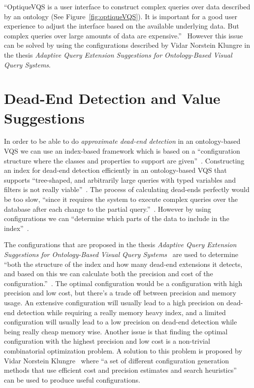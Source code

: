 \documentclass[a4paper,english]{ifimaster/ifimaster}
\begin{document}
``OptiqueVQS is a user interface to construct complex queries over data described by an ontology (See Figure~\ref{fig:optiqueVQS}). It is important for a good user experience to adjust the interface based on the available underlying data. But complex queries over large amounts of data are expensive.''~\cite{VQS_search} However this issue can be solved by using the configurations described by Vidar Norstein Klungre in the thesis \textit{Adaptive Query Extension Suggestions for Ontology-Based Visual Query Systems}.~\cite{vidar-phd-2020}


\section{Dead-End Detection and Value Suggestions}

In order to be able to do \textit{approximate dead-end detection} in an ontology-based VQS we can use an index-based framework which is based on a ``configuration structure where the classes and properties to support are given''~\cite{vidar-phd-2020}. Constructing an index for dead-end detection efficiently in an ontology-based VQS that supports ``tree-shaped, and arbitrarily large queries with typed variables and filters is not really viable''~\cite{vidar-phd-2020}. The process of calculating dead-ends perfectly would be too slow, ``since it requires the system to execute complex queries over the database after each change to the partial query.''~\cite{vidar-phd-2020}. However by using configurations we can ``determine which parts of the data to include in the index''~\cite{vidar-phd-2020}. 

The configurations that are proposed in the thesis \textit{Adaptive Query Extension Suggestions for Ontology-Based Visual Query Systems}~\cite{vidar-phd-2020} are used to determine ``both the structure of the index and how many dead-end extensions it detects, and based on this we can calculate both the precision and cost of the configuration.''~\cite{vidar-phd-2020}. The optimal configuration would be a configuration with high precision and low cost, but there's a trade off between precision and memory usage. An extensive configuration will usually lead to a high precision on dead-end detection while requiring a really memory heavy index, and a limited configuration will usually lead to a low precision on dead-end detection while being really cheap memory wise. Another issue is that finding the optimal configuration with the highest precision and low cost is a non-trivial combinatorial optimization problem. A solution to this problem is proposed by Vidar Norstein Klungre~\cite{vidar-phd-2020} where ``a set of different configuration generation methods that use efficient cost and precision estimates and search heuristics''~\cite{vidar-phd-2020} can be used to produce useful configurations. 
\end{document}
